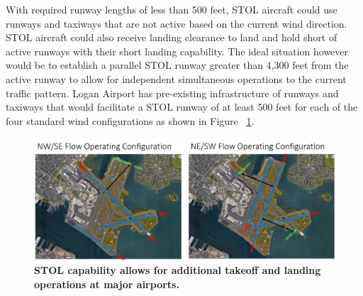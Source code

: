 \documentclass[]{aiaa-tc}%
\begin{document}
With required runway lengths of less than 500 feet, STOL aircraft could use runways and taxiways that are not active based on the current wind direction. STOL aircraft could also receive landing clearance to land and hold short of active runways with their short landing capability. The ideal situation however would be to establish a parallel STOL runway greater than 4,300 feet from the active runway to allow for independent simultaneous operations to the current traffic pattern. Logan Airport has pre-existing infrastructure of runways and taxiways that would facilitate a STOL runway of at least 500 feet for each of the four standard wind configurations as shown in Figure ~\ref{f:logan}.
\begin{figure}[h!]
	\begin{center}
	\includegraphics[width=1.0\textwidth]{Logan Independent Ops.pdf}
    \caption{\textbf{STOL capability allows for additional takeoff and landing operations at major airports.}}
	\label{f:logan}
	\end{center}
\end{figure}
\end{document}

